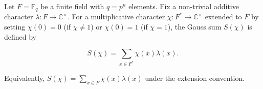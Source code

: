 Let $F = \mathbb{F}_q$ be a finite field with $q = p^n$ elements. Fix a non-trivial additive character $\lambda: F \to \mathbb{C}^\times$. For a multiplicative character $\chi: F^* \to \mathbb{C}^\times$ extended to $F$ by setting $\chi(0) = 0$ (if $\chi \neq 1$) or $\chi(0) = 1$ (if $\chi = 1$), the Gauss sum $S(\chi)$ is defined by

$$S(\chi) = \sum_{x \in F^*} \chi(x) \lambda(x).$$

Equivalently, $S(\chi) = \sum_{x \in F} \chi(x) \lambda(x)$ under the extension convention.

